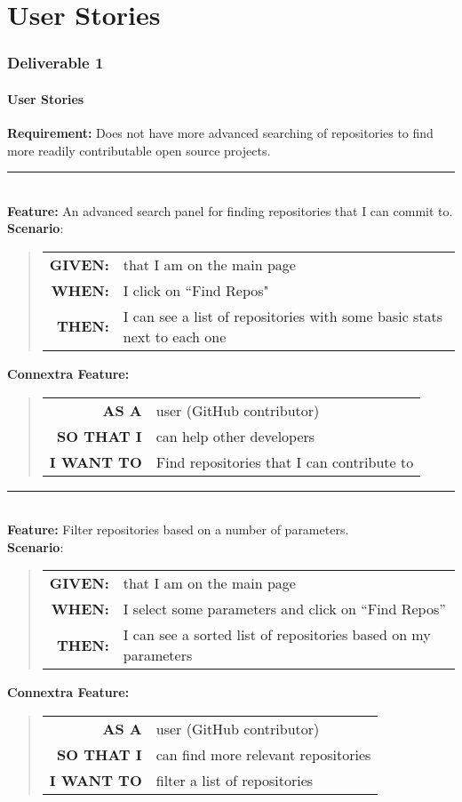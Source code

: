 \documentclass[12pt]{article}
\newcommand{\Requirement}[1] {
   \noindent \textbf{Requirement:} #1
}
\newcommand{\Feature}[1]{ 
   \noindent \textbf{Feature:} #1
}
\newcommand{\CFeature}[4]{
\noindent \textbf{Connextra Feature:}
	\begin{quote}
	\begin{tabular}{rl}
	\textbf{AS A} & #1\\
	\textbf{SO THAT \uppercase{#2}} & #3\\
	\textbf{\uppercase{#2} WANT TO} & #4  
	\end{tabular}
	\end{quote}
}
\newcommand{\GivenSc} {
	\noindent \textbf{GIVEN:}
	}
\newcommand{\WhenSc} {
	\noindent \textbf{WHEN:}
	}
\newcommand{\AndSc} {
	\noindent \textbf{AND:}
	}
\newcommand{\ThenSc} {
	\noindent \textbf{THEN:}
	}
\begin{document}


\pagebreak
\setcounter{part}{1}
\setcounter{section}{1}
\setcounter{subsection}{0}
\part{User Stories}
\section*{Deliverable 1}
\subsection{User Stories}








\begin{framed}

\Requirement{Does not have more advanced searching of repositories to find more readily contributable open source projects.}\\[0.2cm]

\hrule~\\

\Feature{An advanced search panel for finding repositories that I can commit to.}\\[0.2cm]

\noindent \textbf{Scenario}:
\begin{quote}
\begin{tabular}{rl}
\GivenSc & that I am on the main page\\
\WhenSc & I click on ``Find Repos"\\
\ThenSc & I can see a list of repositories with some basic stats next to each one
\end{tabular}
\end{quote}

\CFeature{user (\textsf{GitHub} contributor)}{I}{can help other developers}{Find repositories that I can contribute to}

\hrule~\\

\Feature{Filter repositories based on a number of parameters.}\\[0.4cm]
\noindent \textbf{Scenario}:
\begin{quote}
\begin{tabular}{rl}
\GivenSc & that I am on the main page\\
\WhenSc & I select some parameters and click on ``Find Repos''\\
\ThenSc & I can see a sorted list of repositories based on my parameters
\end{tabular}
\end{quote}

\CFeature{user (\textsf{GitHub} contributor)}{I}{can find more relevant repositories}{filter a list of repositories}
\end{framed}
\end{document}
